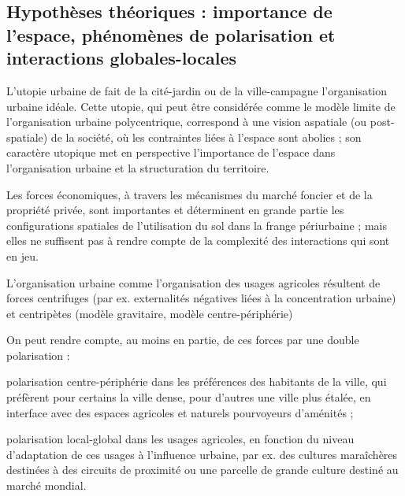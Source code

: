 \stopitemize


\subsection{Hypothèses théoriques :
   importance de l'espace, phénomènes de polarisation
   et interactions globales-locales}

\startitemize[n]

\item	L'utopie urbaine de \citet{howard_tomorrow_2003} fait de la cité-jardin ou de la ville-campagne
	l'organisation urbaine idéale.
	Cette utopie, qui peut être considérée comme le modèle limite de l'organisation urbaine polycentrique,
	correspond à une vision aspatiale (ou post-spatiale)
	de la société, où les contraintes liées à l'espace sont abolies ;
	son caractère utopique met en perspective
	l'importance de l'espace dans l'organisation urbaine
	et la structuration du territoire.

\item 	Les forces économiques, à travers les mécanismes
	du marché foncier et de la propriété privée,
	sont importantes et déterminent en grande partie
	les configurations spatiales de l'utilisation du sol
	dans la frange périurbaine ;
	mais elles ne suffisent pas à rendre compte
	de la complexité des interactions qui sont en jeu.

\item	L'organisation urbaine comme l'organisation
	des usages agricoles résultent
	de forces centrifuges (par ex. externalités négatives
	liées à la concentration urbaine) et centripètes
	(modèle gravitaire, modèle centre-périphérie)

	On peut rendre compte, au moins en partie, de ces forces
	par une double polarisation :

	\startitemize[a,packed]

    \item 	polarisation centre-périphérie
     	dans les préférences des habitants de la ville,
		qui préfèrent pour certains la ville dense,
		pour d'autres une ville plus étalée, en interface avec des
		espaces agricoles et naturels pourvoyeurs d'aménités ;

    \item	polarisation local-global dans les usages agricoles,
		en fonction du niveau d'adaptation de ces usages
		à l'influence urbaine, par ex. des cultures maraîchères
		destinées à des circuits de proximité ou une parcelle
		de grande culture destiné au marché mondial.

